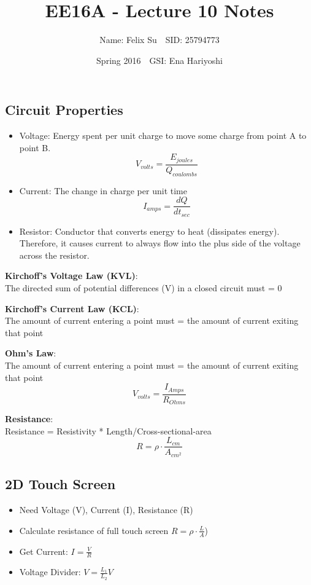 \documentclass{article}\usepackage{amsmath,amssymb,amsthm,tikz,tkz-graph,color,chngpage,soul,hyperref,csquotes,graphicx,floatrow}\newcommand*{\QEDB}{\hfill\ensuremath{\square}}\newtheorem*{prop}{Proposition}\renewcommand{\theenumi}{\alph{enumi}}\usepackage[shortlabels]{enumitem}\usepackage[nobreak=true]{mdframed}\usetikzlibrary{matrix,calc}\MakeOuterQuote{"}\usepackage[margin=0.75in]{geometry} \newtheorem{theorem}{Theorem}
\title{EE16A - Lecture 10 Notes}
\author{Name: Felix Su$\quad$SID: 25794773}
\date{Spring 2016$\quad$GSI: Ena Hariyoshi}
\begin{document}
\maketitle

\subsection*{Circuit Properties}
\begin{itemize}
\item Voltage: Energy spent per unit charge to move some charge from point A to point B.\\
    \begin{equation}V_{volts} = \frac{E_{joules}}{Q_{coulombs}}\end{equation}
\item Current: The change in charge per unit time\\
    \begin{equation}I_{amps} = \frac{dQ}{dt_{sec}}\end{equation}
\item Resistor: Conductor that converts energy to heat (dissipates energy). Therefore, it causes current to always flow into the plus side of the voltage across the resistor.
\end{itemize}
\begin{mdframed}
\textbf{Kirchoff's Voltage Law (KVL)}:\\
The directed sum of potential differences (V) in a closed circuit must = 0
\end{mdframed}
\begin{mdframed}
\textbf{Kirchoff's Current Law (KCL)}:\\
The amount of current entering a point must = the amount of current exiting that point
\end{mdframed}
\begin{mdframed}
\textbf{Ohm's Law}:\\
The amount of current entering a point must = the amount of current exiting that point\\
    $$V_{volts} = \frac{I_{Amps}}{R_{Ohms}}$$
\end{mdframed}
\begin{mdframed}
\textbf{Resistance}:\\
    Resistance = Resistivity * Length/Cross-sectional-area\\
    $$R = \rho \cdot \frac{L_{cm}}{A_{cm^2}}$$
\end{mdframed}
\subsection*{2D Touch Screen}
\begin{itemize}
\item Need Voltage (V), Current (I), Resistance (R)
\item Calculate resistance of full touch screen $R = \rho \cdot \frac{L}{A}$)
\item Get Current: $I = \frac{V}{R}$
\item Voltage Divider: $V = \frac{L_1}{L_2}V$
\end{itemize}
\end{document}

